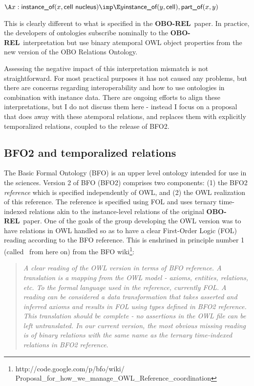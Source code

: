 \documentclass{bioinfo}
\def\P1{\pr{P-1}}
\def\partOf{\pr{part\_of}}
\def\instanceOf{\pr{instance\_of}}
\def\CellNucleus{\pr{cell nucleus}}
\def\Cell{\pr{cell}}
\def\OBOREL{\textbf{OBO-REL}}
\begin{document}
$
\A x : \instanceOf(x, \CellNucleus) \imp \\
 \E y \instanceOf(y, \Cell), \partOf(x,y)
$

This is clearly different to what is specified in the \OBOREL\ paper.
In practice, the developers of ontologies subscribe nominally to the
\OBOREL\ interpretation but use binary atemporal OWL object properties
from the new version of the OBO Relations Ontology\cite{RO2010}.

Assessing the negative impact of this interpretation mismatch is not
straightforward. For most practical purposes it has not caused any
problems, but there are concerns regarding interoperability and how to
use ontologies in combination with instance data. There are ongoing
efforts to align these interpretations, but I do not discuss them here
- instead I focus on a proposal that does away with these atemporal
relations, and replaces them with explicitly temporalized relations,
coupled to the release of BFO2.

\subsection{BFO2 and temporalized relations}

The Basic Formal Ontology (BFO) is an upper level ontology intended
for use in the sciences\cite{Grenon2004}. Version 2 of BFO (BFO2)
comprises two components: (1) the BFO2 \emph{reference}\cite{BFO2Ref}
which is specified independently of OWL, and (2) the OWL realization
of this reference. The reference is specified using FOL and uses
ternary time-indexed relations akin to the instance-level relations of
the original \OBOREL\ paper. One of the goals of the group developing
the OWL version was to have relations in OWL handled so as to have a
clear First-Order Logic (FOL) reading according to the BFO
reference. This is enshrined in principle number 1 (called \P1\ from
here on) from the BFO
wiki\footnote{http://code.google.com/p/bfo/wiki/
  Proposal\_for\_how\_we\_manage\_OWL\_Reference\_coordination}:

\begin{quotation}
  \emph{A clear reading of the OWL version in terms of BFO reference. A
  translation is a mapping from the OWL model - axioms, entities,
  relations, etc. To the formal language used in the reference,
  currently FOL. A reading can be considered a data transformation
  that takes asserted and inferred axioms and results in FOL using
  types defined in BFO2 reference. This translation should be complete
  - no assertions in the OWL file can be left untranslated. In our
  current version, the most obvious missing reading is of binary
  relations with the same name as the ternary time-indexed relations
  in BFO2 reference}.
\end{quotation}
\end{document}
